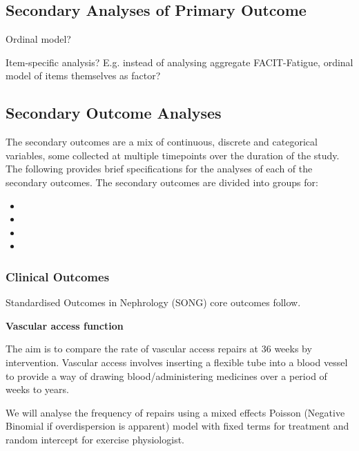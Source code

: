 \documentclass[
]{article}
\begin{document}
\hypertarget{secondary-analyses-primary}{%
  \subsection{Secondary Analyses of Primary Outcome}\label{secondary-analyses-primary}}

Ordinal model?

Item-specific analysis? E.g. instead of analysing aggregate FACIT-Fatigue, ordinal model of items themselves as factor?

\hypertarget{secondary-analyses}{%
  \subsection{Secondary Outcome Analyses}\label{secondary-outcome-analyses}}

The secondary outcomes are a mix of continuous, discrete and categorical variables, some collected at multiple timepoints over the duration of the study.
The following provides brief specifications for the analyses of each of the secondary outcomes.
The secondary outcomes are divided into groups for:

\begin{itemize}
  \item {}
  \item {}
  \item {}
  \item {}
\end{itemize}

\hypertarget{clinical-outcomes}{%
  \subsubsection{Clinical Outcomes}\label{clinical-outcomes}}

Standardised Outcomes in Nephrology (SONG) core outcomes follow.

\textbf{Vascular access function}

The aim is to compare the rate of vascular access repairs at 36 weeks by intervention.
Vascular access involves inserting a flexible tube into a blood vessel to provide a way of drawing blood/administering medicines over a period of weeks to years.

We will analyse the frequency of repairs using a mixed effects Poisson (Negative Binomial if overdispersion is apparent) model with fixed terms for treatment and random intercept for exercise physiologist.
\end{document}
